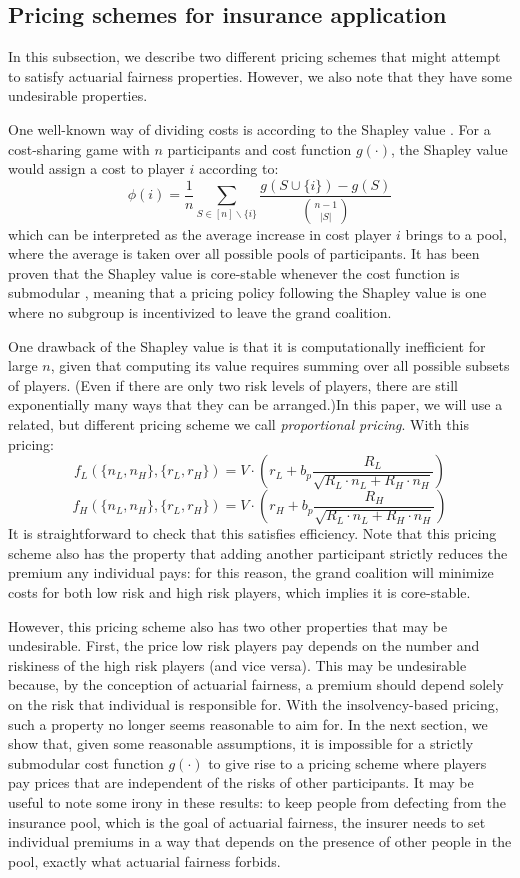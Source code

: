 \documentclass[sigconf]{acmart}
\newcommand{\p}[1]{\left( #1 \right)}
\newcommand{\nL}[0]{\ensuremath{n_L}}
\newcommand{\nH}[0]{\ensuremath{n_H}}
\newcommand{\rL}[0]{\ensuremath{r_L}}
\newcommand{\rH}[0]{\ensuremath{r_H}}
\newcommand{\RL}[0]{\ensuremath{R_L}}
\newcommand{\RH}[0]{\ensuremath{R_H}}
\newcommand{\V}[0]{\ensuremath{V}}
\newcommand{\bp}[0]{\ensuremath{b_p}}
\newcommand{\cost}[0]{\ensuremath{g}}
\newcommand{\priceL}[0]{\ensuremath{f_L}}
\newcommand{\priceH}[0]{\ensuremath{f_H}}
\newcommand{\cd}[0]{\cdot}
\begin{document}
\subsection{Pricing schemes for insurance application}
In this subsection, we describe two different pricing schemes that might attempt to satisfy actuarial fairness properties. However, we also note that they have some undesirable properties. 

One well-known way of dividing costs is according to the Shapley value \cite{shapley1971cores}. For a cost-sharing game with $n$ participants and cost function $\cost(\cd)$, the Shapley value would assign a cost to player $i$ according to: 
$$\phi(i) = \frac{1}{n}\sum_{S \in [n]\backslash \{i\}}\frac{\cost(S \cup \{i\}) - \cost(S)}{\binom{n-1}{\vert S \vert}}$$
which can be interpreted as the average increase in cost player $i$ brings to a pool, where the average is taken over all possible pools of participants. It has been proven that the Shapley value is core-stable whenever the cost function is submodular \cite{shapley1971cores,bondareva1963some}, meaning that a pricing policy following the Shapley value is one where no subgroup is incentivized to leave the grand coalition. 

One drawback of the Shapley value is that it is computationally inefficient for large $n$, given that computing its value requires summing over all possible subsets of players. (Even if there are only two risk levels of players, there are still exponentially many ways that they can be arranged.)In this paper, we will use a related, but different pricing scheme we call \emph{proportional pricing}. With this pricing: 
$$\priceL(\{\nL,\nH \}, \{\rL, \rH\}) = \V \cd \p{\rL  + \bp \frac{\RL}{\sqrt{\RL \cd \nL + \RH \cd \nH}}}$$
$$\priceH(\{\nL,\nH \}, \{\rL, \rH\}) = \V \cd \p{\rH  + \bp \frac{\RH}{\sqrt{\RL \cd \nL + \RH \cd \nH}}}$$
It is straightforward to check that this satisfies efficiency. Note that this pricing scheme also has the property that adding another participant strictly reduces the premium any individual pays: for this reason, the grand coalition will minimize costs for both low risk and high risk players, which implies it is core-stable. 

However, this pricing scheme also has two other properties that may be undesirable. First, the price low risk players pay depends on the number and riskiness of the high risk players (and vice versa). This may be undesirable because, by the conception of actuarial fairness, a premium should depend solely on the risk that individual is responsible for. With the insolvency-based pricing, such a property no longer seems reasonable to aim for. In the next section, we show that, given some reasonable assumptions, it is impossible for a strictly submodular cost function $\cost(\cd)$ to give rise to a pricing scheme where players pay prices that are independent of the risks of other participants. It may be useful to note some irony in these results: to keep people from defecting from the insurance pool, which is the goal of actuarial fairness, the insurer needs to set individual premiums in a way that depends on the presence of other people in the pool, exactly what actuarial fairness forbids. 
\end{document}
